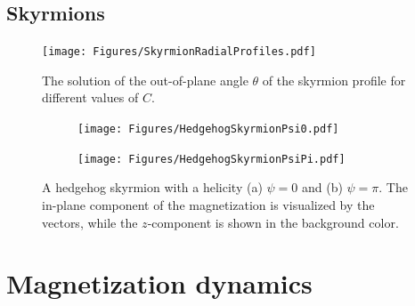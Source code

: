 \documentclass[12pt, a4paper, twoside, openright]{article}		%
\let\oldsection\section
\def\section{\cleardoublepage\oldsection}
\numberwithin{equation}{section}
\begin{document}
\subsection{Skyrmions}
\begin{figure}[h!]
\begin{center}
\texttt{[image: Figures/SkyrmionRadialProfiles.pdf]} 
\caption{The solution of the out-of-plane angle $\theta$ of the skyrmion profile for different values of $C$.}
\label{fig:dipole_field} 
\end{center}
\end{figure}
\begin{figure}[h!]
\centering
\begin{subfigure}{.49\textwidth}
  \centering
  \texttt{[image: Figures/HedgehogSkyrmionPsi0.pdf]}
  \caption{}
  \label{fig:ThetaBulk}
\end{subfigure}
\begin{subfigure}{.49\textwidth}
  \centering
  \texttt{[image: Figures/HedgehogSkyrmionPsiPi.pdf]}
  \caption{}
  \label{fig:ThetaInt}
\end{subfigure}
\caption{A hedgehog skyrmion with a helicity (a) $\psi = 0$ and (b) $\psi = \pi$. The in-plane component of the magnetization is visualized by the vectors, while the $z$-component is shown in the background color.}
\label{fig:ThetaRho}
\end{figure}
\section{Magnetization dynamics}
\end{document}
